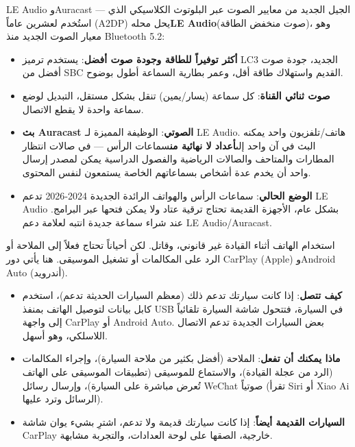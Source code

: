 \begin{tcbinfo}{LE Audio وAuracast — الجيل الجديد من معايير الصوت عبر البلوتوث}
الكلاسيكي الذي استُخدم لعشرين عاماً (A2DP) يحل محله\textbf{LE Audio}(صوت منخفض الطاقة)، وهو معيار الصوت الجديد منذ Bluetooth 5.2:

\begin{itemize}
  \item \textbf{أكثر توفيراً للطاقة وجودة صوت أفضل}: يستخدم ترميز LC3 الجديد، جودة صوت أفضل من SBC القديم واستهلاك طاقة أقل، وعمر بطارية السماعة أطول بوضوح.
  \item \textbf{صوت ثنائي القناة}: كل سماعة (يسار/يمين) تنقل بشكل مستقل، التبديل لوضع سماعة واحدة لا يقطع الاتصال.
  \item \textbf{بث Auracast الصوتي}: الوظيفة المميزة لـ LE Audio. هاتف/تلفزيون واحد يمكنه البث في آن واحد إلى\textbf{أعداد لا نهائية من}سماعات الرأس — في صالات انتظار المطارات والمتاحف والصالات الرياضية والفصول الدراسية يمكن لمصدر إرسال واحد أن يخدم عدة أشخاص بسماعاتهم الخاصة يستمعون لنفس المحتوى.
  \item \textbf{الوضع الحالي}: سماعات الرأس والهواتف الرائدة الجديدة 2024-2026 تدعم LE Audio بشكل عام، الأجهزة القديمة تحتاج ترقية عتاد ولا يمكن فتحها عبر البرامج. عند شراء سماعة جديدة انتبه لعلامة دعم LE Audio/Auracast.
\end{itemize}

\end{tcbinfo}


استخدام الهاتف أثناء القيادة غير قانوني، وقاتل. لكن أحياناً تحتاج فعلاً إلى الملاحة أو الرد على المكالمات أو تشغيل الموسيقى. هنا يأتي دور CarPlay (Apple) وAndroid Auto (أندرويد).

\begin{itemize}
  \item \textbf{كيف تتصل}: إذا كانت سيارتك تدعم ذلك (معظم السيارات الحديثة تدعم)، استخدم كابل بيانات لتوصيل الهاتف بمنفذ USB في السيارة، فتتحول شاشة السيارة تلقائياً إلى واجهة CarPlay أو Android Auto. بعض السيارات الجديدة تدعم الاتصال اللاسلكي، وهو أسهل.
  \item \textbf{ماذا يمكنك أن تفعل}: الملاحة (أفضل بكثير من ملاحة السيارة)، وإجراء المكالمات (الرد من عجلة القيادة)، والاستماع للموسيقى (تطبيقات الموسيقى على الهاتف تُعرض مباشرة على السيارة)، وإرسال رسائل WeChat صوتياً (تقرأ Siri أو Xiao Ai الرسائل وترد عليها).
  \item \textbf{السيارات القديمة أيضاً}: إذا كانت سيارتك قديمة ولا تدعم، اشترِ بشيء يوان شاشة CarPlay خارجية، الصقها على لوحة العدادات، والتجربة مشابهة.
\end{itemize}

